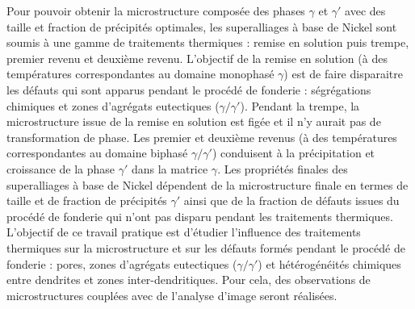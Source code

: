 Pour pouvoir obtenir la microstructure composée des phases $\gamma$ et $\gamma'$ avec des taille et fraction de précipités optimales, les superalliages à base de Nickel sont soumis à une gamme de traitements thermiques : remise en solution puis trempe, premier revenu et deuxième revenu. L’objectif de la remise en solution (à des températures correspondantes au domaine monophasé $\gamma$) est de faire disparaitre les défauts qui sont apparus pendant le procédé de fonderie : ségrégations chimiques et zones d’agrégats eutectiques ($\gamma / \gamma'$). Pendant la trempe, la microstructure issue de la remise en solution est figée et il n’y aurait pas de transformation de phase. Les premier et deuxième revenus (à des températures correspondantes au domaine biphasé $\gamma / \gamma'$) conduisent à la précipitation et croissance de la phase $\gamma'$ dans la matrice $\gamma$. Les propriétés finales des superalliages à base de Nickel dépendent de la microstructure finale en termes de taille et de fraction de précipités $\gamma'$ ainsi que de la fraction de défauts issues du procédé de fonderie qui n’ont pas disparu pendant les traitements thermiques.
L’objectif de ce travail pratique est d’étudier l’influence des traitements thermiques sur la microstructure et sur les défauts formés pendant le procédé de fonderie : pores, zones d’agrégats eutectiques ($\gamma / \gamma'$) et hétérogénéités chimiques entre dendrites et zones inter-dendritiques. Pour cela, des observations de microstructures couplées avec de l’analyse d’image seront réalisées.
